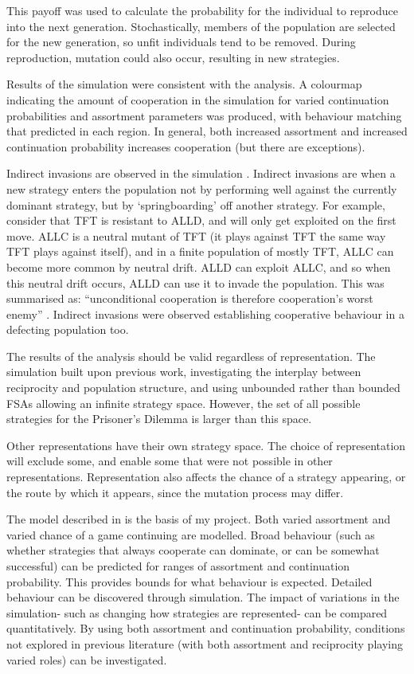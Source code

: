 \documentclass[a4paper,11pt,bcshonoursthesis,singlespace,oneside,thesisdraft,pdflatex]{cssethesis}
\begin{document}
This payoff was used to calculate the probability for the individual to reproduce into the next generation. Stochastically, members of the population are selected for the new generation, so unfit individuals tend to be removed. 
During reproduction, mutation could also occur, resulting in new strategies. 

Results of the simulation were consistent with the analysis. 
A colourmap indicating the amount of cooperation in the simulation for varied continuation probabilities and assortment parameters was produced, with behaviour matching that predicted in each region. 
In general, both increased assortment and increased continuation probability increases cooperation (but there are exceptions). 

Indirect invasions are observed in the simulation \citep{garcia:PLoSOne:2012}. 
Indirect invasions are when a new strategy enters the population not by performing well against the currently dominant strategy, but by `springboarding' off another strategy. 
For example, consider that TFT is resistant to ALLD, and will only get exploited on the first move. 
ALLC is a neutral mutant of TFT (it plays against TFT the same way TFT plays against itself), and in a finite population of mostly TFT, ALLC can become more common by neutral drift. 
ALLD can exploit ALLC, and so when this neutral drift occurs, ALLD can use it to invade the population. 
This was summarised as: ``unconditional cooperation is therefore cooperation's worst enemy'' \citep{van-veelen:PNAS:2012}. 
Indirect invasions were observed establishing cooperative behaviour in a defecting population too. 

The results of the analysis should be valid regardless of representation. The simulation built upon previous work, investigating the interplay between reciprocity and population structure, and using unbounded rather than bounded FSAs allowing an infinite strategy space. 
However, the set of all possible strategies for the Prisoner's Dilemma is larger than this space. 

Other representations have their own strategy space. 
The choice of representation will exclude some, and enable some that were not possible in other representations. 
Representation also affects the chance of a strategy appearing, or the route by which it appears, since the mutation process may differ.
 
The model described in \citet{van-veelen:PNAS:2012} is the basis of my project. 
Both varied assortment and varied chance of a game continuing are modelled. 
Broad behaviour (such as whether strategies that always cooperate can dominate, or can be somewhat successful) can be predicted for ranges of assortment and continuation probability. This provides bounds for what behaviour is expected. 
Detailed behaviour can be discovered through simulation. 
The impact of variations in the simulation- such as changing how strategies are represented- can be compared quantitatively.
By using both assortment and continuation probability, conditions not explored in previous literature (with both assortment and reciprocity playing varied roles) can be investigated.
\end{document}
